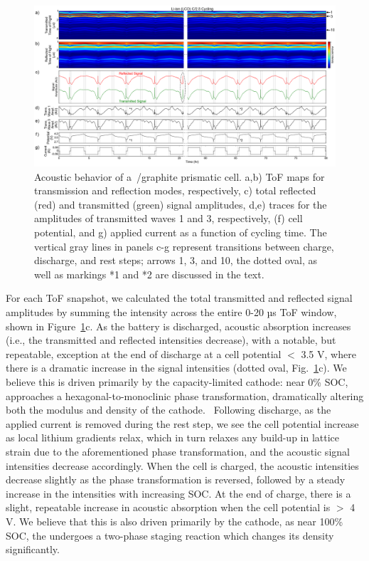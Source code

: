 \begin{figure}[htb]
  \centering
    \includegraphics[width=\textwidth]{ch4-bw/images/lco.png}
    \caption[Acoustic behavior of a~/graphite prismatic cell.]{Acoustic behavior of a~/graphite prismatic cell. a,b) ToF maps for transmission and reflection modes, respectively, c) total reflected (red) and transmitted (green) signal amplitudes, d,e) traces for the amplitudes of transmitted waves 1 and 3, respectively, (f) cell potential, and g) applied current as a function of cycling time. The vertical gray lines in panels c-g represent transitions between charge, discharge, and rest steps; arrows 1, 3, and 10, the dotted oval, as well as markings *1 and *2 are discussed in the text.}
    \label{fig:lco}
\end{figure}

For each ToF snapshot, we calculated the total transmitted and reflected signal amplitudes by summing the intensity across the entire 0-20 µs ToF window, shown in Figure~\ref{fig:lco}c. As the battery is discharged, acoustic absorption increases (i.e., the transmitted and reflected intensities decrease), with a notable, but repeatable, exception at the end of discharge at a cell potential $<$ 3.5 V, where there is a dramatic increase in the signal intensities (dotted oval, Fig.~\ref{fig:lco}c). We believe this is driven primarily by the capacity-limited cathode: near 0\% SOC,~ approaches a hexagonal-to-monoclinic phase transformation, dramatically altering both the modulus and density of the cathode.~\cite{Reimers1992-ql} Following discharge, as the applied current is removed during the rest step, we see the cell potential increase as local lithium gradients relax, which in turn relaxes any build-up in lattice strain due to the aforementioned phase transformation, and the acoustic signal intensities decrease accordingly. When the cell is charged, the acoustic intensities decrease slightly as the phase transformation is reversed, followed by a steady increase in the intensities with increasing SOC. At the end of charge, there is a slight, repeatable increase in acoustic absorption when the cell potential is $>$ 4 V. We believe that this is also driven primarily by the cathode, as near 100\% SOC, the  undergoes a two-phase staging reaction which changes its density significantly.~\cite{Van_der_Ven1998-tq}
	

